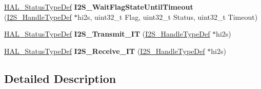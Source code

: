 \begin{DoxyCompactItemize}
\item 
\hyperlink{stm32f4xx__hal__def_8h_a63c0679d1cb8b8c684fbb0632743478f}{H\+A\+L\+\_\+\+Status\+Type\+Def} {\bfseries I2\+S\+\_\+\+Wait\+Flag\+State\+Until\+Timeout} (\hyperlink{struct_i2_s___handle_type_def}{I2\+S\+\_\+\+Handle\+Type\+Def} $\ast$hi2s, uint32\+\_\+t Flag, uint32\+\_\+t Status, uint32\+\_\+t Timeout)\hypertarget{group___i2_s___private___functions_gab49e7928ef4021ca00931059b0cc3545}{}\label{group___i2_s___private___functions_gab49e7928ef4021ca00931059b0cc3545}

\item 
\hyperlink{stm32f4xx__hal__def_8h_a63c0679d1cb8b8c684fbb0632743478f}{H\+A\+L\+\_\+\+Status\+Type\+Def} {\bfseries I2\+S\+\_\+\+Transmit\+\_\+\+IT} (\hyperlink{struct_i2_s___handle_type_def}{I2\+S\+\_\+\+Handle\+Type\+Def} $\ast$hi2s)\hypertarget{group___i2_s___private___functions_ga80e9ca584798c1c970bd234b7294b09b}{}\label{group___i2_s___private___functions_ga80e9ca584798c1c970bd234b7294b09b}

\item 
\hyperlink{stm32f4xx__hal__def_8h_a63c0679d1cb8b8c684fbb0632743478f}{H\+A\+L\+\_\+\+Status\+Type\+Def} {\bfseries I2\+S\+\_\+\+Receive\+\_\+\+IT} (\hyperlink{struct_i2_s___handle_type_def}{I2\+S\+\_\+\+Handle\+Type\+Def} $\ast$hi2s)\hypertarget{group___i2_s___private___functions_ga63ccf6ad24ce0c2ea10431c268898abb}{}\label{group___i2_s___private___functions_ga63ccf6ad24ce0c2ea10431c268898abb}

\end{DoxyCompactItemize}


\subsection{Detailed Description}
